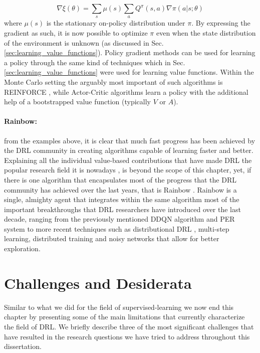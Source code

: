 \begin{equation}
	\nabla \xi(\theta) = \sum_{s} \mu(s) \sum_{a} Q^{\pi}(s,a) \nabla \pi(a|s;\theta)
\end{equation}
where $\mu(s)$ is the stationary on-policy distribution under $\pi$. By expressing the gradient as such, it is now possible to optimize $\pi$ even when the state distribution of the environment is unknown (as discussed in Sec. \ref{sec:learning_value_functions}). Policy gradient methods can be used for learning a policy through the same kind of techniques which in Sec. \ref{sec:learning_value_functions} were used for learning value functions. Within the Monte Carlo setting the arguably most important of such algorithms is REINFORCE \cite{williams1992simple}, while Actor-Critic algorithms \cite{lillicrap2015continuous,schulman2015high,schulman2015trust,wang2016sample,mnih2016asynchronous,schulman2017proximal,haarnoja2018soft,fujimoto2018addressing} learn a policy with the additional help of a bootstrapped value function (typically $V$ or $A$).


\paragraph{Rainbow:} from the examples above, it is clear that much fast progress has been achieved by the DRL community in creating algorithms capable of learning faster and better. Explaining all the individual value-based contributions that have made DRL the popular research field it is nowadays \cite{henderson2018deep}, is beyond the scope of this chapter, yet, if there is one algorithm that encapsulates most of the progress that the DRL community has achieved over the last years, that is Rainbow \cite{hessel2018rainbow}. Rainbow is a single, almighty agent that integrates within the same algorithm most of the important breakthroughs that DRL researchers have introduced over the last decade, ranging from the previously mentioned DDQN algorithm and PER system to more recent techniques such as distributional DRL \cite{bellemare2017distributional}, multi-step learning, distributed training \cite{mnih2016asynchronous} and noisy networks \cite{fortunato2017noisy} that allow for better exploration.


\section{Challenges and Desiderata}
\label{sec:challenges}
Similar to what we did for the field of supervised-learning we now end this chapter by presenting some of the main limitations that currently characterize the field of DRL. We briefly describe three of the most significant challenges that have resulted in the research questions we have tried to address throughout this dissertation.

